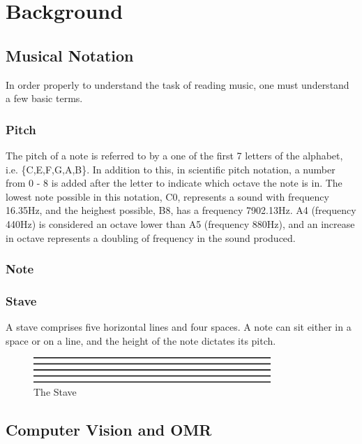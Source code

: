 \section{Background}
    \subsection{Musical Notation}
        In order properly to understand the task of reading music, one must understand a few basic terms.

        \subsubsection{Pitch}
            The pitch of a note is referred to by a one of the first 7 letters of the alphabet, i.e. \{C,E,F,G,A,B\}.
            In addition to this, in scientific pitch notation, a number from 0 - 8 is added after the letter to indicate which octave the note is in.
            The lowest note possible in this notation, C0, represents a sound with frequency 16.35Hz, and the heighest possible, B8, has a frequency 7902.13Hz.
            A4 (frequency 440Hz) is considered an octave lower than A5 (frequency 880Hz), and an increase in octave represents a doubling of frequency in the sound produced.
        \subsubsection{Note}
               
        \subsubsection{Stave}
            A stave comprises five horizontal lines and four spaces. A note can sit either in a space or on a line, and the height of the note dictates its pitch.
            \begin{figure}[ht!]
            \centering
            \includegraphics[width=90mm]{./assets/staff.png}
            \caption{The Stave}
            \label{stave}
            \end{figure}


    \subsection{Computer Vision and OMR}
